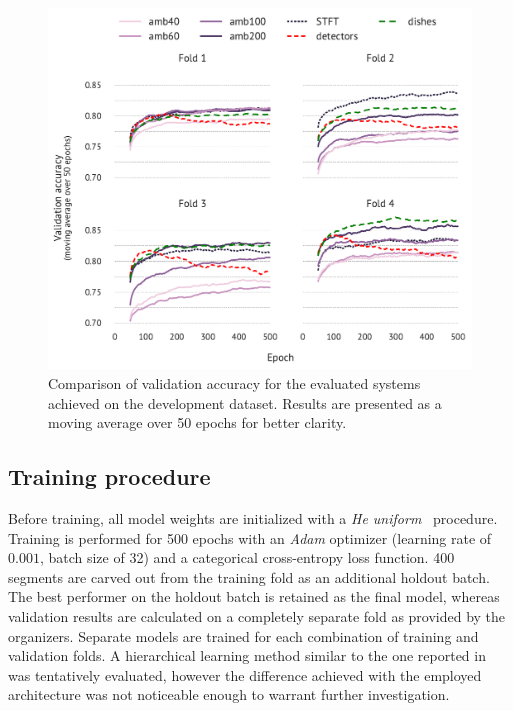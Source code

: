 \documentclass{article}
\begin{document}
\begin{sloppy}
\begin{figure}[t]
  \centering
  \centerline{\includegraphics[width=\columnwidth]{figures/validation.pdf}}
  \vspace{-6pt}
  \caption{Comparison of validation accuracy for the evaluated systems achieved on the development dataset. Results are presented as a moving average over 50 epochs for better clarity.}
  \label{fig:validation}
  \vspace{-8pt}
\end{figure}

\vspace{-6pt}
\subsection{Training procedure}

Before training, all model weights are initialized with a \textit{He uniform}~\cite{he2015} procedure. Training is performed for 500 epochs with an \textit{Adam} optimizer (learning rate of $0.001$, batch size of 32) and a categorical cross-entropy loss function. 400 segments are carved out from the training fold as an additional holdout batch. The best performer on the holdout batch is retained as the final model, whereas validation results are calculated on a completely separate fold as provided by the organizers. Separate models are trained for each combination of training and validation folds. A hierarchical learning method similar to the one reported in~\cite{xu2016} was tentatively evaluated, however the difference achieved with the employed architecture was not noticeable enough to warrant further investigation.


\end{sloppy}
\end{document}
